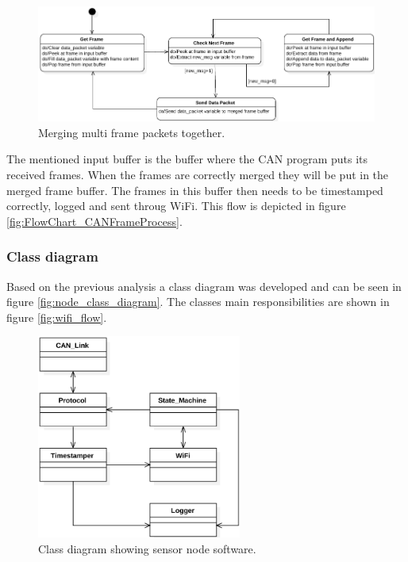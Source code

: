 \begin{figure}[!h]
\centering
\includegraphics[width=1\textwidth]{graphics/StateDiagram_ConcatMsgProcess}
\caption{Merging multi frame packets together.}
\label{fig:StateDiagram_ConcatMsgProcess}
\end{figure}

The mentioned input buffer is the buffer where the CAN program puts its received frames. 
When the frames are correctly merged they will be put in the merged frame buffer.
The frames in this buffer then needs to be timestamped correctly, logged and sent throug WiFi.
This flow is depicted in figure \ref{fig:FlowChart_CANFrameProcess}.


\subsubsection*{Class diagram}
Based on the previous analysis a class diagram was developed and can be seen in figure \ref{fig:node_class_diagram}.
The classes main responsibilities are shown in figure \ref{fig:wifi_flow}.

\begin{figure}[!h]
\centering
\includegraphics[width=0.6\textwidth]{graphics/ClassDiagram_NodeWiFi}
\caption{Class diagram showing sensor node software.}
\label{fig:StateDiagram_ConcatMsgProcess}
\end{figure}

